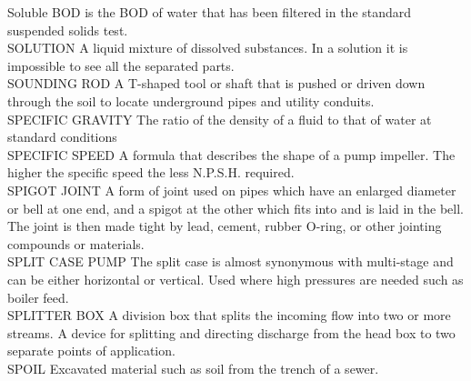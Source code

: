 \documentclass{article}
\begin{document}
Soluble BOD is the BOD of water that has been filtered in the standard suspended solids test.
\vspace{0.3cm}\\
SOLUTION
A liquid mixture of dissolved substances. In a solution it is impossible to see all the separated parts.
\vspace{0.3cm}\\
SOUNDING ROD
A T-shaped tool or shaft that is pushed or driven down through the soil to locate underground pipes and utility conduits. 
\vspace{0.3cm}\\
SPECIFIC GRAVITY
The ratio of the density of a fluid to that of water at standard conditions
\vspace{0.3cm}\\
SPECIFIC SPEED
A formula that describes the shape of a pump impeller. The higher the specific speed the less N.P.S.H. required.
\vspace{0.3cm}\\
SPIGOT JOINT
A form of joint used on pipes which have an enlarged diameter or bell at one end, and a spigot at the other which fits into and is laid in the bell. The joint is then made tight by lead, cement, rubber O-ring, or other jointing compounds or materials. 
\vspace{0.3cm}\\
SPLIT CASE PUMP
The split case is almost synonymous with multi-stage and can be either horizontal or vertical. Used where high pressures are needed such as boiler feed.
\vspace{0.3cm}\\
SPLITTER BOX
A division box that splits the incoming flow into two or more streams. A device for splitting and directing discharge from the head box to two separate points of application.
\vspace{0.3cm}\\
SPOIL
Excavated material such as soil from the trench of a sewer. 
\vspace{0.3cm}\\
\end{document}
